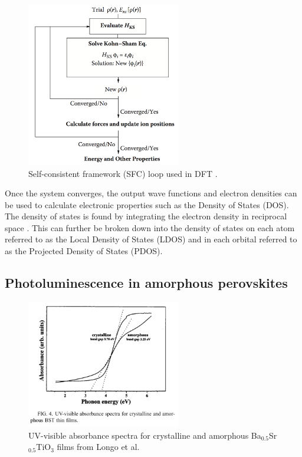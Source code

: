 \documentclass[3p,review,12pt]{elsarticle}
\begin{document}
\begin{figure}[H]
	\includegraphics[width=0.6\textwidth]{scf}
	\centering
	\caption{Self-consistent framework (SFC) loop used in DFT \cite{Lee2012}.} 
\end{figure}

Once the system converges, the output wave functions and electron densities can be used to calculate electronic properties such as the Density of States (DOS). The density of states is found by integrating the electron density in reciprocal space \cite{Sholl2009}. This can further be broken down into the density of states on each atom referred to as the Local Density of States (LDOS) and in each orbital referred to as the Projected Density of States (PDOS).


\subsection{Photoluminescence in amorphous perovskites}
\begin{figure}[h]
	\includegraphics[width=0.6\textwidth]{longo3}
	\centering
	\caption{UV-visible absorbance spectra for crystalline and amorphous Ba$_{0.5}$Sr$_{0.5}$TiO$_{3}$ films from Longo et al. \cite{Longo2004}} 
\end{figure}
\end{document}
